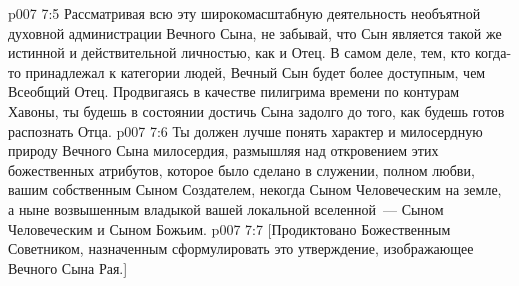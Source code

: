 \vs p007 7:5 \pc Рассматривая всю эту широкомасштабную деятельность необъятной духовной администрации Вечного Сына, не забывай, что Сын является такой же истинной и действительной личностью, как и Отец. В самом деле, тем, кто когда\hyp{}то принадлежал к категории людей, Вечный Сын будет более доступным, чем Всеобщий Отец. Продвигаясь в качестве пилигрима времени по контурам Хавоны, ты будешь в состоянии достичь Сына задолго до того, как будешь готов распознать Отца.
\vs p007 7:6 Ты должен лучше понять характер и милосердную природу Вечного Сына милосердия, размышляя над откровением этих божественных атрибутов, которое было сделано в служении, полном любви, вашим собственным Сыном Создателем, некогда Сыном Человеческим на земле, а ныне возвышенным владыкой вашей локальной вселенной~--- Сыном Человеческим и Сыном Божьим.
\vsetoff
\vs p007 7:7 [Продиктовано Божественным Советником, назначенным сформулировать это утверждение, изображающее Вечного Сына Рая.]
\quizlink
